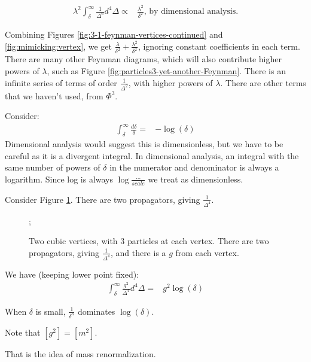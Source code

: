 \documentclass[]{article}
\begin{document}
\begin{align*}
	\lambda^2 \int_{\delta}^\infty \frac{1}{\Delta^6} d^4 \Delta \propto& \frac{\lambda^2}{\delta^2} \text{, by dimensional analysis.}
\end{align*}

Combining Figures \ref{fig:3-1-feynman-vertices-continued} and  \ref{fig:mimicking:vertex}, we get $\frac{\lambda}{\delta^2} + \frac{\lambda^2}{\delta^2}$, ignoring constant coefficients in each term.
There are many other Feynman diagrams, which will also contribute higher powers of $\lambda$, such as Figure \ref{fig:particles3-yet-another-Feynman}. There is an infinite series of terms of order $\frac{1}{\Delta^2}$, with higher powers of $\lambda$. There are other terms that we haven't used, from $\Phi^3$.

Consider:
\begin{align*}
	\int_{\delta}^{\infty} \frac{d \delta}{\delta} =& - \log(\delta)
\end{align*}
Dimensional analysis would suggest this is dimensionless, but we have to be careful as it is a divergent integral. In dimensional analysis, an integral with  the same number of powers of $\delta$ in the numerator and denominator is always a logarithm. Since log is always $\log\frac{...}{scale}$ we treat as dimensionless.

Consider Figure \ref{fig:particles3-1-two-cubic-vertices}. There are two propagators, giving $\frac{1}{\Delta^4}$.
\begin{figure}[H]
	\begin{center}
		\caption[Two cubic vertices, with 3 particles at each vertex.]{Two cubic vertices, with 3 particles at each vertex. There are two propagators, giving $\frac{1}{\Delta^4}$, and there is a $g$ from each vertex.}\label{fig:particles3-1-two-cubic-vertices}
		;
	\end{center}
\end{figure}

We have (keeping lower point fixed):
\begin{align*}
	\int_{\delta}^{\infty} \frac{g^2}{\Delta^4} d^4 \Delta =& g^2 \log(\delta)
\end{align*}

When $\delta$ is small, $\frac{1}{\delta^n}$ dominates $\log(\delta)$.

Note that $[g^2] = [m^2]$.

That is the idea of mass renormalization.
\end{document}
